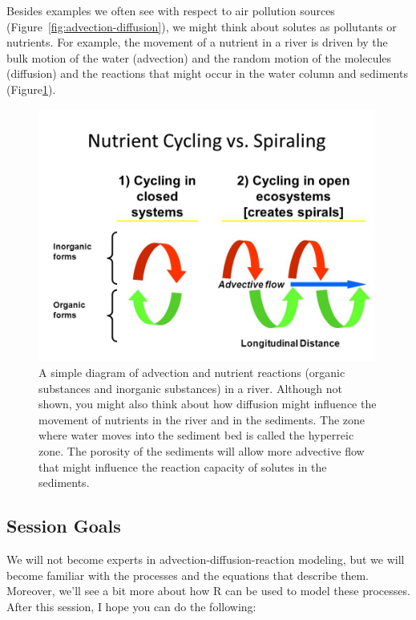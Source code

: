 \documentclass{tufte-handout}\usepackage[]{graphicx}\usepackage[]{xcolor}
\begin{document}
Besides examples we often see with respect to air pollution sources (Figure~\ref{fig:advection-diffusion}), we might think about solutes as pollutants or nutrients. For example, the movement of a nutrient in a river is driven by the bulk motion of the water (advection) and the random motion of the molecules (diffusion) and the reactions that might occur in the water column and sediments (Figure\ref{fig:nutrientspiraling}).

\begin{figure}
\caption{A simple diagram of advection and nutrient reactions (organic substances and inorganic substances) in a river. Although not shown, you might also think about how diffusion might influence the movement of nutrients in the river and in the sediments.  
The zone where water moves into the sediment bed is called the hyperreic zone. The porosity of the sediments will allow more advective flow that might influence the reaction capacity of solutes in the sediments.}
\label{fig:nutrientspiraling}
\centering
\includegraphics[width=0.99\textwidth]{graphics/NutrientSpiraling.jpg}
\end{figure}


\subsection{Session Goals}

We will not become experts in advection-diffusion-reaction modeling, but we will become familiar with the processes and the equations that describe them. Moreover, we'll see a bit more about how R can be used to model these processes. After this session, I hope you can do the following:
\end{document}
